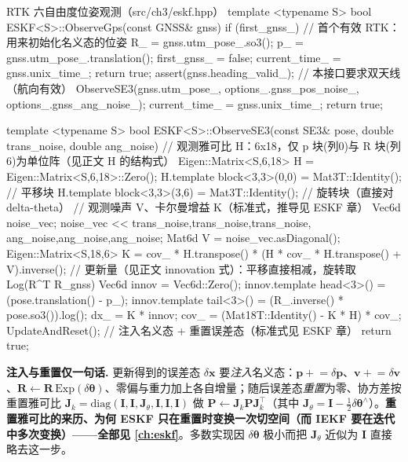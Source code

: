 \begin{codebox}[C++]{RTK 六自由度位姿观测（src/ch3/eskf.hpp）}
template <typename S>
bool ESKF<S>::ObserveGps(const GNSS& gnss) {
  if (first_gnss_) {                          // 首个有效 RTK：用来初始化名义态的位姿
    R_ = gnss.utm_pose_.so3();
    p_ = gnss.utm_pose_.translation();
    first_gnss_ = false; current_time_ = gnss.unix_time_;
    return true;
  }
  assert(gnss.heading_valid_);                // 本接口要求双天线（航向有效）
  ObserveSE3(gnss.utm_pose_, options_.gnss_pos_noise_, options_.gnss_ang_noise_);
  current_time_ = gnss.unix_time_;
  return true;
}

template <typename S>
bool ESKF<S>::ObserveSE3(const SE3& pose, double trans_noise, double ang_noise) {
  // 观测雅可比 H：6x18，仅 p 块(列0)与 R 块(列6)为单位阵（见正文 H 的结构式）
  Eigen::Matrix<S,6,18> H = Eigen::Matrix<S,6,18>::Zero();
  H.template block<3,3>(0,0) = Mat3T::Identity();   // 平移块
  H.template block<3,3>(3,6) = Mat3T::Identity();   // 旋转块（直接对 delta-theta）
  // 观测噪声 V、卡尔曼增益 K（标准式，推导见 ESKF 章）
  Vec6d noise_vec; noise_vec << trans_noise,trans_noise,trans_noise, ang_noise,ang_noise,ang_noise;
  Mat6d V = noise_vec.asDiagonal();
  Eigen::Matrix<S,18,6> K = cov_ * H.transpose() * (H * cov_ * H.transpose() + V).inverse();
  // 更新量（见正文 innovation 式）：平移直接相减，旋转取 Log(R^T R_gnss)
  Vec6d innov = Vec6d::Zero();
  innov.template head<3>() = (pose.translation() - p_);
  innov.template tail<3>() = (R_.inverse() * pose.so3()).log();
  dx_  = K * innov;
  cov_ = (Mat18T::Identity() - K * H) * cov_;
  UpdateAndReset();      // 注入名义态 + 重置误差态（标准式见 ESKF 章）
  return true;
}
\end{codebox}

\begin{note}
\textbf{注入与重置仅一句话.}\;
更新得到的误差态 $\delta\mathbf{x}$ 要\emph{注入}名义态：$\mathbf{p}\!\mathrel{+}=\!\delta\mathbf{p}$、$\mathbf{v}\!\mathrel{+}=\!\delta\mathbf{v}$、$\mathbf{R}\!\leftarrow\!\mathbf{R}\,\mathrm{Exp}(\delta\boldsymbol{\theta})$、零偏与重力加上各自增量；随后误差态\emph{重置}为零、协方差按重置雅可比 $\mathbf{J}_k=\mathrm{diag}(\mathbf{I},\mathbf{I},\mathbf{J}_\theta,\mathbf{I},\mathbf{I},\mathbf{I})$ 做 $\mathbf{P}\!\leftarrow\!\mathbf{J}_k\mathbf{P}\mathbf{J}_k^\top$（其中 $\mathbf{J}_\theta=\mathbf{I}-\tfrac12\delta\boldsymbol{\theta}^\wedge$）。\textbf{重置雅可比的来历、为何 ESKF 只在重置时变换一次切空间（而 IEKF 要在迭代中多次变换）——全部见 \cref{ch:eskf}}\cite{gao2023slamad}。多数实现因 $\delta\boldsymbol{\theta}$ 极小而把 $\mathbf{J}_\theta$ 近似为 $\mathbf{I}$ 直接略去这一步。
\end{note}


